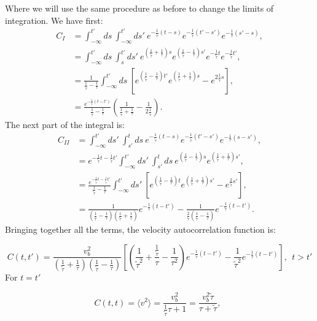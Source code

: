 \documentclass[%
10pt,
superscriptaddress,
twocolumn,
 amsmath,amssymb,
 aps,prx,
]{revtex4-2}
\begin{document}
Where we will use the same procedure as before to change the limits of integration. We have first:
\begin{align}
	C_{I} &= \int_{-\infty}^{t'}ds \ \int_{-\infty}^{t'} ds' \ e^{-\frac{1}{\tilde{\tau}}(t-s)}e^{-\frac{1}{\tilde{\tau}}(t'-s')}e^{-\frac{1}{\tau}(s'-s)},\\
	&=\int_{-\infty}^{t'}ds \ \int_{s}^{t'}ds' \ e^{(\frac{1}{\tilde{\tau}}+\frac{1}{\tau})s}e^{(\frac{1}{\tilde{\tau}}-\frac{1}{\tau})s'}e^{-\frac{1}{\tilde{\tau}} t}e^{-\frac{1}{\tilde{\tau}} t'},\\
	&=\frac{1}{\frac{1}{\tilde{\tau}} - \frac{1}{\tau}}\int_{-\infty}^{t'} ds \ \left[e^{(\frac{1}{\tilde{\tau}}-\frac{1}{\tau})t'}e^{(\frac{1}{\tilde{\tau}}+\frac{1}{\tau})s}-e^{2\frac{1}{\tilde{\tau}} s}\right],\\
	&=\frac{e^{-\frac{1}{\tilde{\tau}}(t-t')}}{\frac{1}{\tilde{\tau}}-\frac{1}{\tau}}\left(\frac{1}{\frac{1}{\tilde{\tau}}+\frac{1}{\tau}}-\frac{1}{2\frac{1}{\tilde{\tau}}}\right).
\end{align}
The next part of the integral is:
\begin{align}
	C_{II} &= \int_{-\infty}^{t'}ds' \ \int_{s'}^{t} ds \ e^{-\frac{1}{\tilde{\tau}}(t-s)}e^{-\frac{1}{\tilde{\tau}}(t'-s')}e^{-\frac{1}{\tau}(s-s')},\\
	&=e^{-\frac{1}{\tilde{\tau}} t-\frac{1}{\tilde{\tau}} t'}\int_{-\infty}^{t'}ds'\ \int_{s'}^{t}ds\ e^{(\frac{1}{\tilde{\tau}}-\frac{1}{\tau})s}e^{(\frac{1}{\tilde{\tau}} +\frac{1}{\tau})s'},\\
	&=\frac{e^{-\frac{1}{\tilde{\tau}} t - \frac{1}{\tilde{\tau}} t'}}{\frac{1}{\tilde{\tau}}-\frac{1}{\tau}}\int_{-\infty}^{t'}ds'\ \left[e^{(\frac{1}{\tilde{\tau}}-\frac{1}{\tau})t}e^{(\frac{1}{\tilde{\tau}}+\frac{1}{\tau})s'}-e^{\frac{2}{\tilde{\tau}} s'}\right],\\
	&=\frac{1}{(\frac{1}{\tilde{\tau}}-\frac{1}{\tau})(\frac{1}{\tilde{\tau}}+\frac{1}{\tau})}e^{-\frac{1}{\tau}(t-t')}-\frac{1}{\frac{2}{\tilde{\tau}}(\frac{1}{\tilde{\tau}}-\frac{1}{\tau})}e^{-\frac{1}{\tilde{\tau}}(t-t')}.
\end{align}
Bringing together all the terms, the velocity autocorrelation function is:

\begin{equation}
	C(t,t')= \frac{v_b^2}{(\frac{1}{\tilde{\tau}}+\frac{1}{\tau})(\frac{1}{\tilde{\tau}}-\frac{1}{\tau})}\left[\left(\frac{1}{\tilde{\tau}^2} + \frac{\frac{1}{\tilde{\tau}}}{\tau} -\frac{1}{\tau^2}\right)e^{-\frac{1}{\tilde{\tau}}(t-t')}-\frac{1}{\tilde{\tau}^2} e^{-\frac{1}{\tau}(t-t')}\right], \ \ t > t'
\end{equation}
For $t=t'$

\begin{equation}
	C(t,t)= \langle v^2 \rangle = \frac{v_b^2}{\frac{1}{\tilde{\tau}} \tau+1}=\frac{v_b^2\tilde{\tau}}{\tau+\tilde{\tau}}, \ \ 
\end{equation}










\end{document}
